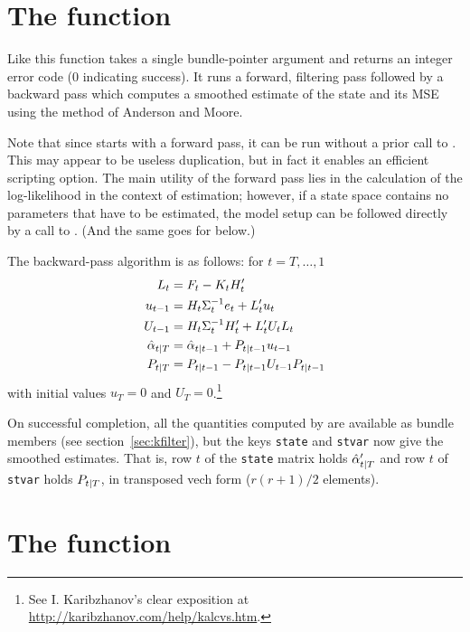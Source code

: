 \documentclass[a4paper]{article}
\begin{document}
\section{The  function}
\label{sec:ksmooth}

Like  this function takes a single bundle-pointer
argument and returns an integer error code (0 indicating success).  It
runs a forward, filtering pass followed by a backward pass which
computes a smoothed estimate of the state and its MSE using the method
of Anderson and Moore.

Note that since  starts with a forward pass, it can be
run without a prior call to . This may appear to be
useless duplication, but in fact it enables an efficient scripting
option.  The main utility of the forward pass lies in the calculation
of the log-likelihood in the context of estimation; however, if a
state space contains no parameters that have to be estimated, the
model setup can be followed directly by a call to . (And
the same goes for  below.)

The backward-pass algorithm is as follows: for $t=T,\dots,1$
%
\begin{align*}
L_t &= F_t - K_t H_t' \\
u_{t-1} &= H_t \Sigma_t^{-1} e_t 
 + L_t' u_t \\
U_{t-1} &= H_t \Sigma_t^{-1} H_t' + 
  L_t' U_t L_t \\
\hat{\alpha}_{t|T} &= \hat{\alpha}_{t|t-1} + 
  P_{t|t-1} u_{t-1} \\
P_{t|T} &= P_{t|t-1} - 
  P_{t|t-1} U_{t-1} P_{t|t-1}
\end{align*}
%
with initial values $u_T = 0$ and $U_T =
0$.\footnote{See I. Karibzhanov's clear exposition at
\url{http://karibzhanov.com/help/kalcvs.htm}.}

On successful completion, all the quantities computed by
 are available as bundle members (see
section~\ref{sec:kfilter}), but the keys \texttt{state} and
\texttt{stvar} now give the smoothed estimates.  That is, row $t$ of
the \texttt{state} matrix holds $\hat{\alpha}_{t|T}'$ and row $t$
of \texttt{stvar} holds $P_{t|T}$, in transposed vech form
($r(r+1)/2$ elements).

\section{The  function}
\label{sec:kdsmooth}
\end{document}
